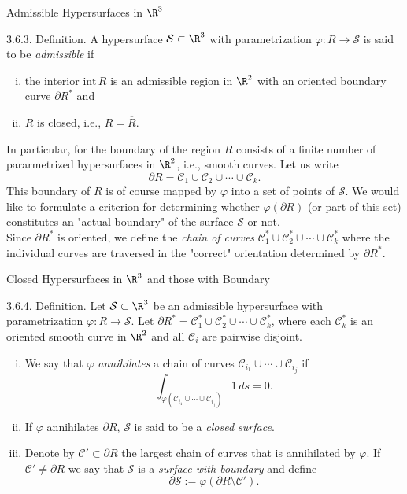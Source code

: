 \documentclass[smaller,hyperref={CJKbookmarks=true}]{beamer}
\begin{document}
\begin{frame}[t]{Admissible Hypersurfaces in $\R^3$}
\begin{spacing}{1}
\alert{3.6.3. Definition.} A hypersurface $\mathcal{S}\subset\R^3$ with parametrization $\varphi:R\to\mathcal{S}$ is said to be \emph{admissible} if
\begin{enumerate}[(i)]
  \item the interior $\text{int}\,R$ is an admissible region in $\R^2$ with an oriented boundary curve $\partial R^*$ and
  \item $R$ is closed, i.e., $R=\overline{R}$.
\end{enumerate}
In particular, for the boundary of the region $R$ consists of a finite number of pararmetrized hypersurfaces in $\R^2$, i.e., smooth curves. Let us write
\[\partial R=\mathcal{C}_1\cup\mathcal{C}_2\cup\cdots
\cup\mathcal{C}_k.\]
This boundary of $R$ is of course mapped by $\varphi$ into a set of points of $\mathcal{S}$. We would like to formulate a criterion for determining whether $\varphi(\partial R)$ (or part of this set) constitutes an "actual boundary" of the surface $\mathcal{S}$ or not.\\[4pt]
Since $\partial R^*$ is oriented, we define the \emph{chain of curves} $\mathcal{C}_1^*\cup\mathcal{C}_2^*\cup\cdots
\cup\mathcal{C}_k^*$ where the individual curves are traversed in the "correct" orientation determined by $\partial R^*$.
\end{spacing}
\end{frame}
\begin{frame}[t]{Closed Hypersurfaces in $\R^3$ and those with Boundary}
\begin{spacing}{1.1}
\alert{3.6.4. Definition.} Let $\mathcal{S}\subset\R^3$ be an admissible hypersurface with parametrization $\varphi:R\to\mathcal{S}$. Let $\partial R^*=\mathcal{C}_1^*\cup\mathcal{C}_2^*\cup\cdots
\cup\mathcal{C}_k^*$, where each $\mathcal{C}_k^*$ is an oriented smooth curve in $\R^2$ and all $\mathcal{C}_i$ are pairwise disjoint.
\begin{enumerate}[(i)]
  \item We say that $\varphi$ \emph{annihilates} a chain of curves $\mathcal{C}_{i_1}\cup\cdots\cup\mathcal{C}_{i_j}$ if
      \[\int_{\varphi(\mathcal{C}_{i_1}\cup\cdots\cup\mathcal{C}_{i_j})}1\,ds=0.\]
  \item If $\varphi$ annihilates $\partial R$, $\mathcal{S}$ is said to be a \emph{closed surface}.
  \item Denote by $\mathcal{C}'\subset\partial R$ the largest chain of curves that is annihilated by $\varphi$. If $\mathcal{C}'\neq\partial R$ we say that $\mathcal{S}$ is a \emph{surface with boundary} and define
      \setcounter{equation}{0}
      \begin{equation}\label{3.6.1}
        \partial\mathcal{S}:=\varphi(\partial R\setminus\mathcal{C}').
      \end{equation}
\end{enumerate}
\end{spacing}
\end{frame}
\end{document}
